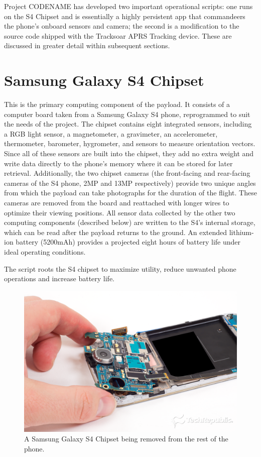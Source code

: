 \documentclass[english]{report}
\begin{document}
Project CODENAME has developed two important operational scripts: one runs on the S4 Chipset and is essentially a highly persistent app that commandeers the phone's onboard sensors and camera; the second is a modification to the source code shipped with the Tracksoar APRS Tracking device.  These are discussed in greater detail within subsequent sections.


\section{Samsung Galaxy S4 Chipset}

This is the primary computing component of the payload. It consists
of a computer board taken from a Samsung Galaxy S4 phone, reprogrammed
to suit the needs of the project. The chipset contains eight integrated
sensors, including a RGB light sensor, a magnetometer, a gravimeter,
an accelerometer, thermometer, barometer, hygrometer, and sensors
to measure orientation vectors. Since all of these sensors are built into
the chipset, they add no extra weight and write data directly to the
phone's memory where it can be stored for later retrieval. Additionally,
the two chipset cameras (the front-facing and rear-facing cameras
of the S4 phone, 2MP and 13MP respectively) provide two unique angles
from which the payload can take photographs for the duration of the
flight. These cameras are removed from the board and reattached with
longer wires to optimize their viewing positions. All sensor data
collected by the other two computing components (described below)
are written to the S4's internal storage, which can be read after
the payload returns to the ground.  An extended lithium-ion battery (5200mAh) provides a projected eight hours of battery life under ideal operating conditions.

The script roots the S4 chipset to maximize utility, reduce unwanted phone operations and increase battery life. %

\begin{figure}[H]
\begin{centering}
\includegraphics[scale=0.2]{./images/chipset}
\par\end{centering}
\caption{A Samsung Galaxy S4 Chipset being removed from the rest of the phone.}
\end{figure}
\end{document}

